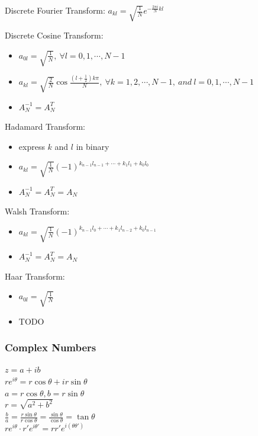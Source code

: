 Discrete Fourier Transform: $a_{kl}=\sqrt{\frac{1}{N}}e^{-\frac{2\pi i}{N}kl}$

Discrete Cosine Transform:
\begin{itemize}
    \item $a_{0l}=\sqrt{\frac{1}{N}},\ \forall l=0,1,\cdots,N-1$
    \item $a_{kl}=\sqrt{\frac{2}{N}}\cos\frac{(l+\frac{1}{2})k\pi}{N},\ \forall k=1,2,\cdots,N-1,\ and\ l=0,1,\cdots, N-1$
    \item $A_N^{-1}=A_N^T$
\end{itemize}

Hadamard Transform:
\begin{itemize}
    \item express $k$ and $l$ in binary
    \item $a_{kl}=\sqrt{\frac{1}{N}}(-1)^{k_{n-1}l_{n-1}+\cdots+k_1l_1+k_0l_0}$
    \item $A_N^{-1}=A_N^T=A_N$
\end{itemize}

Walsh Transform:
\begin{itemize}
    \item $a_{kl}=\sqrt{\frac{1}{N}}(-1)^{k_{n-1}l_{0}+\cdots+k_1l_{n-2}+k_0l_{n-1}}$
    \item $A_N^{-1}=A_N^T=A_N$
\end{itemize}

Haar Transform:
\begin{itemize}
    \item $a_{0l}=\sqrt{\frac{1}{N}}$
    \item TODO
\end{itemize}

\subsubsection*{Complex Numbers}
$z=a+ib$\\
$re^{i\theta}=r\cos\theta+ir\sin\theta$\\
$a=r\cos\theta,b=r\sin\theta$\\
$r=\sqrt{a^2+b^2}$\\
$\frac{b}{a}=\frac{r\sin\theta}{r\cos\theta}=\frac{\sin\theta}{\cos\theta}=\tan\theta$\\
$re^{i\theta}\cdot r'e^{i\theta'}=rr'e^{i(\theta\theta')}$


